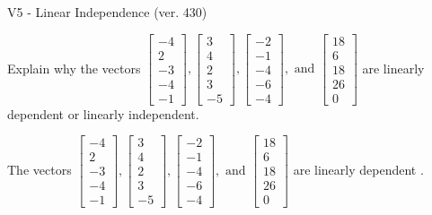 \begin{exercise}
  \begin{exerciseTitle}V5 - Linear Independence (ver. 430)\end{exerciseTitle}
  \begin{exerciseStatement}
    Explain why the vectors \(\left[\begin{array}{r}
-4 \\
2 \\
-3 \\
-4 \\
-1
\end{array}\right] , \left[\begin{array}{r}
3 \\
4 \\
2 \\
3 \\
-5
\end{array}\right] , \left[\begin{array}{r}
-2 \\
-1 \\
-4 \\
-6 \\
-4
\end{array}\right] , \text{ and } \left[\begin{array}{r}
18 \\
6 \\
18 \\
26 \\
0
\end{array}\right]\) are linearly dependent or linearly independent.	


  \end{exerciseStatement}
  \begin{exerciseAnswer}
   The vectors \(\left[\begin{array}{r}
-4 \\
2 \\
-3 \\
-4 \\
-1
\end{array}\right] , \left[\begin{array}{r}
3 \\
4 \\
2 \\
3 \\
-5
\end{array}\right] , \left[\begin{array}{r}
-2 \\
-1 \\
-4 \\
-6 \\
-4
\end{array}\right] , \text{ and } \left[\begin{array}{r}
18 \\
6 \\
18 \\
26 \\
0
\end{array}\right]\) are 
  	 linearly dependent  .
  


  \end{exerciseAnswer}
\end{exercise}